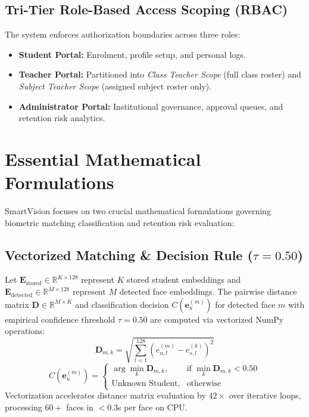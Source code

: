 \documentclass[10pt,journal,compsoc,twocolumn,a4paper]{IEEEtran}
\begin{document}
\subsection{Tri-Tier Role-Based Access Scoping (RBAC)}
The system enforces authorization boundaries across three roles:
\begin{itemize}
    \item \textbf{Student Portal:} Enrolment, profile setup, and personal logs.
    \item \textbf{Teacher Portal:} Partitioned into \textit{Class Teacher Scope} (full class roster) and \textit{Subject Teacher Scope} (assigned subject roster only).
    \item \textbf{Administrator Portal:} Institutional governance, approval queues, and retention risk analytics.
\end{itemize}

\section{Essential Mathematical Formulations}
SmartVision focuses on two crucial mathematical formulations governing biometric matching classification and retention risk evaluation:

\subsection{Vectorized Matching \& Decision Rule ($\tau = 0.50$)}
Let $\mathbf{E}_{\text{stored}} \in \mathbb{R}^{K \times 128}$ represent $K$ stored student embeddings and $\mathbf{E}_{\text{detected}} \in \mathbb{R}^{M \times 128}$ represent $M$ detected face embeddings. The pairwise distance matrix $\mathbf{D} \in \mathbb{R}^{M \times K}$ and classification decision $C(\mathbf{e}_u^{(m)})$ for detected face $m$ with empirical confidence threshold $\tau = 0.50$ are computed via vectorized NumPy operations:
\begin{equation}
\mathbf{D}_{m,k} = \sqrt{\sum_{l=1}^{128} \left( e_{u,l}^{(m)} - e_{s,l}^{(k)} \right)^2}
\end{equation}
\begin{equation}
C(\mathbf{e}_u^{(m)}) = \begin{cases} 
\arg\min_k \mathbf{D}_{m,k}, & \text{if } \min_k \mathbf{D}_{m,k} < 0.50 \\ 
\text{Unknown Student}, & \text{otherwise} 
\end{cases}
\end{equation}
Vectorization accelerates distance matrix evaluation by $42\times$ over iterative loops, processing $60+$ faces in $<0.3$s per face on CPU.
\end{document}
